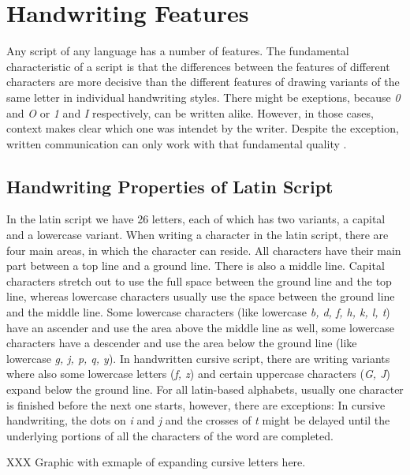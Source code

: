 \section{Handwriting Features}
\label{sec:handwritingfeatures}

Any script of any language has a number of features. The fundamental 
characteristic of a script is that the differences between the features
of different characters are more decisive than the different features of 
drawing variants of the same letter in individual handwriting styles.
There might be exeptions, because \emph{0} and \emph{O} or \emph{1} and 
\emph{I} respectively, can be written alike. However, in those cases, 
context makes clear which one was intendet by the writer.
Despite the exception, written communication can only work with that
fundamental quality .

\subsection{Handwriting Properties of Latin Script}
\label{sec:handwritingpropertieslatin}

In the latin script we have 26 letters, each of which has two variants, 
a capital and a lowercase variant. When writing a character 
in the latin script, there are four main areas, in which the character 
can reside. All characters have their main part between a top line and a 
ground line. There is also a middle line. Capital characters stretch out to use
the full space between the ground line and the top line, whereas lowercase 
characters usually use the space between the ground line and the middle line. 
Some lowercase characters (like lowercase \emph{b, d, f, h, k, l, t}) have an
ascender and use the area above the middle line as well, 
some lowercase characters have a descender and use the area below the ground 
line (like lowercase \emph{g, j, p, q, y}). In handwritten cursive script, 
there are writing variants where also some lowercase letters (\emph{f, z}) and
certain uppercase characters (\emph{G, J}) expand below the ground line.
For all latin-based alphabets, usually one character is finished before the 
next one starts, however, there are exceptions:
In cursive handwriting, the dots on \emph{i} and \emph{j} and the crosses
of \emph{t} might be delayed until the underlying portions of all 
the characters of the word are completed. 

XXX Graphic with exmaple of expanding cursive letters here.


